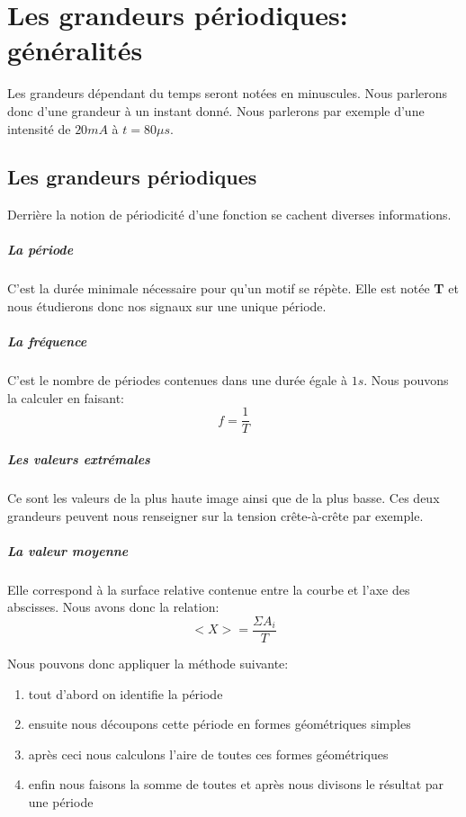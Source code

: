 \documentclass[12pt,a4paper,openany]{book}
\begin{document}
\chapter{Les grandeurs périodiques: généralités}

Les grandeurs dépendant du temps seront notées en minuscules. Nous parlerons donc d'une grandeur à un instant donné. Nous parlerons par exemple d'une intensité de $ 20 mA $ à $ t = 80 \mu s $.

\section{Les grandeurs périodiques}

Derrière la notion de périodicité d'une fonction se cachent diverses informations.

\paragraph{La période} C'est la durée minimale nécessaire pour qu'un motif se répète. Elle est notée \textbf{T} et nous étudierons donc nos signaux sur une unique période.

\paragraph{La fréquence} C'est le nombre de périodes contenues dans une durée égale à $ 1s $. Nous pouvons la calculer en faisant:
\begin{equation}
f = \frac{1}{T}
\end{equation}

\paragraph{Les valeurs extrémales} Ce sont les valeurs de la plus haute image ainsi que de la plus basse. Ces deux grandeurs peuvent nous renseigner sur la tension crête-à-crête par exemple.

\paragraph{La valeur moyenne} Elle correspond à la surface relative contenue entre la courbe et l'axe des abscisses. Nous avons donc la relation:
\begin{equation}
<X> = \frac{\Sigma A_{i}}{T}
\end{equation}

Nous pouvons donc appliquer la méthode suivante:
\begin{enumerate}
\item tout d'abord on identifie la période
\item ensuite nous découpons cette période en formes géométriques simples
\item après ceci nous calculons l'aire de toutes ces formes géométriques
\item enfin nous faisons la somme de toutes et après nous divisons le résultat par une période
\end{enumerate}
\end{document}
